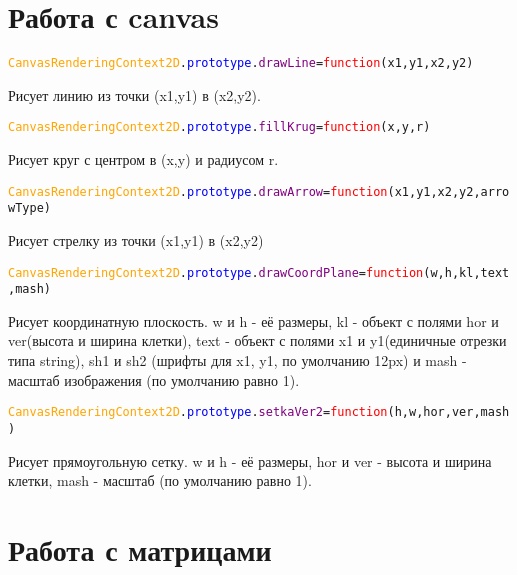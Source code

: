 \documentclass[a4paper,12pt]{article}
\begin{document}
	\section{Работа с canvas}
	\begin{alltt}
		\textcolor{Orange}{CanvasRenderingContext2D}.\textcolor{Blue}{prototype}.\textcolor{Purple}{drawLine}=\textcolor{Red}{function}(x1,y1,x2,y2)
	\end{alltt}
	Рисует линию из точки (x1,y1) в (x2,y2).
	\begin{alltt}
		\textcolor{Orange}{CanvasRenderingContext2D}.\textcolor{Blue}{prototype}.\textcolor{Purple}{fillKrug}=\textcolor{Red}{function}(x,y,r)
	\end{alltt}
	Рисует круг с центром в (x,y) и радиусом r. 
		\begin{alltt}
		\textcolor{Orange}{CanvasRenderingContext2D}.\textcolor{Blue}{prototype}.\textcolor{Purple}{drawArrow}=\textcolor{Red}{function}(x1, y1, x2, y2, arrowType)
	\end{alltt}%
	Рисует стрелку из точки (x1,y1) в (x2,y2)
	\begin{alltt}
		\textcolor{Orange}{CanvasRenderingContext2D}.\textcolor{Blue}{prototype}.\textcolor{Purple}{drawCoordPlane }=\textcolor{Red}{function}(w, h, kl, text, mash)
	\end{alltt}
	Рисует координатную плоскость. w и h  \-- её размеры, kl \-- объект с полями hor и ver(высота и ширина клетки), text \-- объект с полями x1 и y1(единичные отрезки типа string), sh1 и sh2 (шрифты для x1, y1, по умолчанию 12px) и mash - масштаб изображения (по умолчанию равно 1).
	\begin{alltt}
		\textcolor{Orange}{CanvasRenderingContext2D}.\textcolor{Blue}{prototype}.\textcolor{Purple}{setkaVer2  }=\textcolor{Red}{function}(h, w, hor, ver, mash)
	\end{alltt}
	Рисует прямоугольную сетку. w и h  \-- её размеры, hor и ver \-- высота и ширина клетки, mash - масштаб (по умолчанию равно 1).
	\section{Работа с матрицами}
\end{document}
